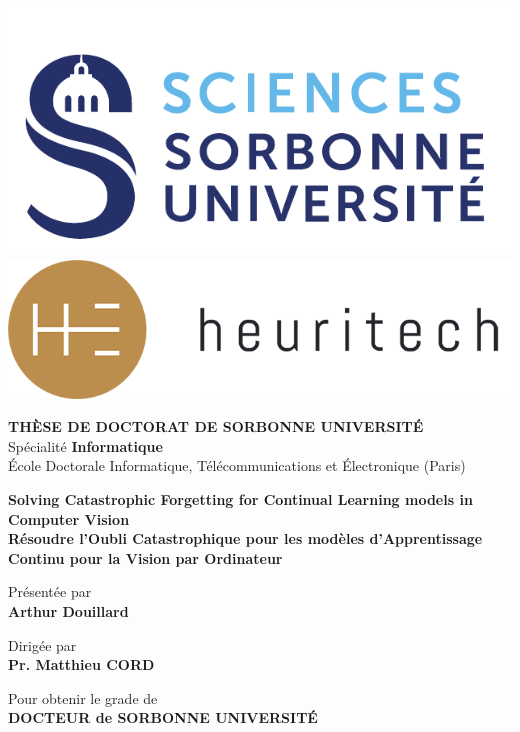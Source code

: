 \begin{titlepage}

  \vspace*{-2.5cm}
  \includegraphics[height=0.15\columnwidth]{images/sorbonne}
  \hspace*{2.5cm}
  \includegraphics[height=0.15\columnwidth]{images/heuritech}
  \vspace*{0.5cm}

  \begin{center}

    {\large \textbf{T\normalsize{HÈSE DE}\large{} D\normalsize{OCTORAT DE}\large{} S\normalsize{ORBONNE}\large{} U\normalsize{NIVERSITÉ}}}\\
    Spécialité \textbf{Informatique}\\
    École Doctorale Informatique, Télécommunications et Électronique (Paris)

    \vspace*{1.5cm}

    {\Large \textbf{Solving Catastrophic Forgetting for Continual Learning models in Computer Vision}} \\[0.5em]
    {\large \textbf{Résoudre l'Oubli Catastrophique pour les modèles d'Apprentissage Continu pour la Vision par Ordinateur}}

    \vspace*{1.2cm}

    Présentée par\\
    {\large \textbf{Arthur {Douillard}}}

    \vspace*{2mm}

    Dirigée par\\
    \textbf{Pr. Matthieu {CORD}}

    \vspace*{5mm}

    Pour obtenir le grade de \ \\
    \textbf{DOCTEUR de SORBONNE UNIVERSITÉ} \ \\


\end{center}
\end{titlepage}
